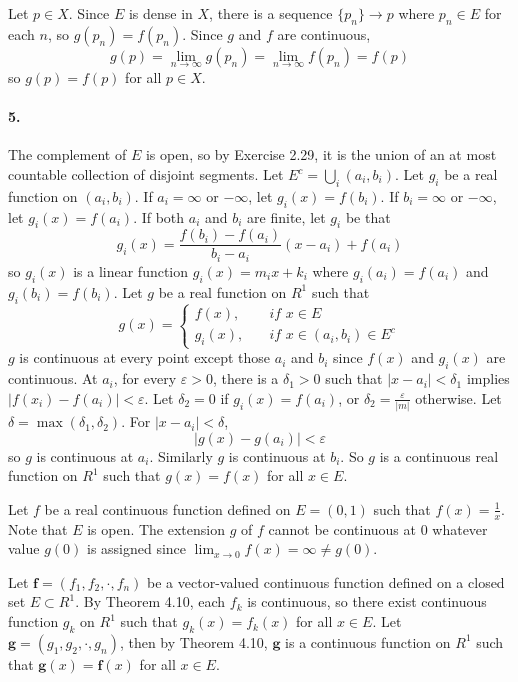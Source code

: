 \documentclass[a4paper]{article}
\begin{document}
Let $p\in X$. Since $E$ is dense in $X$, there is a sequence $\{p_n\}\to p$ where $p_n\in E$ for each $n$, so $g(p_n)=f(p_n)$. Since $g$ and $f$ are continuous,
\[
g(p)=\lim_{n\to\infty}g(p_n)=\lim_{n\to\infty}f(p_n)=f(p)
\]
so $g(p)=f(p)$ for all $p\in X$.

\paragraph{5.}
The complement of $E$ is open, so by Exercise 2.29, it is the union of an at most countable collection of disjoint segments. Let $E^c=\bigcup_i(a_i,b_i)$. Let $g_i$ be a real function on $(a_i,b_i)$. If $a_i=\infty$ or $-\infty$, let $g_i(x)=f(b_i)$. If $b_i=\infty$ or $-\infty$, let $g_i(x)=f(a_i)$. If both $a_i$ and $b_i$ are finite, let $g_i$ be that
\[
g_i(x)=\frac{f(b_i)-f(a_i)}{b_i-a_i}(x-a_i)+f(a_i)
\]
so $g_i(x)$ is a linear function $g_i(x)=m_ix+k_i$ where $g_i(a_i)=f(a_i)$ and $g_i(b_i)=f(b_i)$. Let $g$ be a real function on $R^1$ such that
\[
g(x)=\begin{cases}
f(x),\quad & \textit{if $x\in E$}\\
g_i(x),\quad & \textit{if $x\in(a_i,b_i)\in E^c$}
\end{cases}
\]
$g$ is continuous at every point except those $a_i$ and $b_i$ since $f(x)$ and $g_i(x)$ are continuous. At $a_i$, for every $\varepsilon>0$, there is a $\delta_1>0$ such that $|x-a_i|<\delta_1$ implies $|f(x_i)-f(a_i)|<\varepsilon$. Let $\delta_2=0$ if $g_i(x)=f(a_i)$, or $\delta_2=\frac{\varepsilon}{|m|}$ otherwise. Let $\delta=\max(\delta_1,\delta_2)$. For $|x-a_i|<\delta$, 
\[
|g(x)-g(a_i)|<\varepsilon
\]
so $g$ is continuous at $a_i$. Similarly $g$ is continuous at $b_i$. So $g$ is a continuous real function on $R^1$ such that $g(x)=f(x)$ for all $x\in E$.
\smallskip

Let $f$ be a real continuous function defined on $E=(0,1)$ such that $f(x)=\frac{1}{x}$. Note that $E$ is open. The extension $g$ of $f$ cannot be continuous at $0$ whatever value $g(0)$ is assigned since $\lim_{x\to0}f(x)=\infty\neq g(0)$.
\smallskip

Let $\mathbf{f}=(f_1,f_2,\cdot,f_n)$ be a vector-valued continuous function defined on a closed set $E\subset R^1$. By Theorem 4.10, each $f_k$ is continuous, so there exist continuous function $g_k$ on $R^1$ such that $g_k(x)=f_k(x)$ for all $x\in E$. Let $\mathbf{g}=(g_1,g_2,\cdot,g_n)$, then by Theorem 4.10, $\mathbf{g}$ is a continuous function on $R^1$ such that $\mathbf{g}(x)=\mathbf{f}(x)$ for all $x\in E$.
\end{document}

